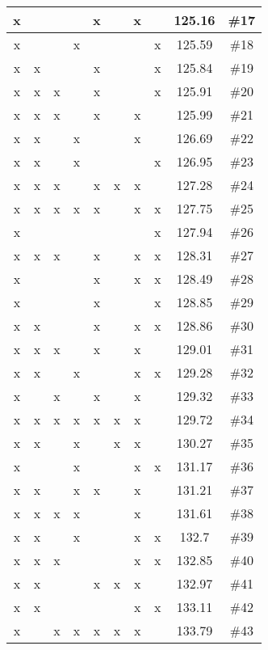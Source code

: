 \begin{center}
\begin{longtable}{|c|c|c|c|c|c|c|c|c|c|}
 x &  &  &  &  x &  &  x &  & 125.16 & \#17 \\ \hline
 x &  &  &  x &  &  &  &  x & 125.59 & \#18 \\ \hline
 x &  x &  &  &  x &  &  &  x & 125.84 & \#19 \\ \hline
 x &  x &  x &  &  x &  &  &  x & 125.91 & \#20 \\ \hline
 x &  x &  x &  &  x &  &  x &  & 125.99 & \#21 \\ \hline
 x &  x &  &  x &  &  &  x &  & 126.69 & \#22 \\ \hline
 x &  x &  &  x &  &  &  &  x & 126.95 & \#23 \\ \hline
 x &  x &  x &  &  x &  x &  x &  & 127.28 & \#24 \\ \hline
 x &  x &  x &  x &  x &  &  x &  x & 127.75 & \#25 \\ \hline
 x &  &  &  &  &  &  &  x & 127.94 & \#26 \\ \hline
 x &  x &  x &  &  x &  &  x &  x & 128.31 & \#27 \\ \hline
 x &  &  &  &  x &  &  x &  x & 128.49 & \#28 \\ \hline
 x &  &  &  &  x &  &  &  x & 128.85 & \#29 \\ \hline
 x &  x &  &  &  x &  &  x &  x & 128.86 & \#30 \\ \hline
 x &  x &  x &  &  x &  &  x &  & 129.01 & \#31 \\ \hline
 x &  x &  &  x &  &  &  x &  x & 129.28 & \#32 \\ \hline
 x &  &  x &  &  x &  &  x &  & 129.32 & \#33 \\ \hline
 x &  x &  x &  x &  x &  x &  x &  & 129.72 & \#34 \\ \hline
 x &  x &  &  x &  &  x &  x &  & 130.27 & \#35 \\ \hline
 x &  &  &  x &  &  &  x &  x & 131.17 & \#36 \\ \hline
 x &  x &  &  x &  x &  &  x &  & 131.21 & \#37 \\ \hline
 x &  x &  x &  x &  &  &  x &  & 131.61 & \#38 \\ \hline
 x &  x &  &  x &  &  &  x &  x & 132.7 & \#39 \\ \hline
 x &  x &  x &  &  &  &  x &  x & 132.85 & \#40 \\ \hline
 x &  x &  &  &  x &  x &  x &  & 132.97 & \#41 \\ \hline
 x &  x &  &  &  &  &  x &  x & 133.11 & \#42 \\ \hline
 x &  &  x &  x &  x &  x &  x &  & 133.79 & \#43 \\ \hline

\end{longtable}
\end{center}
